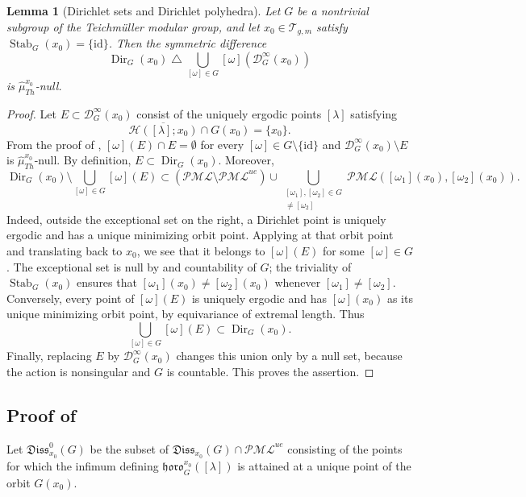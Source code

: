 \documentclass[dvipdfmx]{amsart}
\newtheorem{lemma}{Lemma}[section]
\theoremstyle{remark}
\newcommand{\teich}{\mathcal{T}}
\newcommand{\PThursM}{\hat{\mu}_{Th}}
\newcommand{\pml}{\mathcal{PML}}
\newcommand{\horo}{\mathfrak{horo}}
\newcommand{\Dirichlet}{\mathscr{D}}
\newcommand{\horos}{\mathscr{H}}
\newcommand{\dissipativepart}{\mathfrak{Diss}}
\begin{document}
\begin{lemma}[Dirichlet sets and Dirichlet polyhedra]
\label{lem:DirichletSets_Polyhedrons}
Let $G$ be a nontrivial subgroup of the Teichm\"uller modular group, and let
$x_0\in \teich_{g,m}$ satisfy $\operatorname{Stab}_G(x_0)=\{\mathrm{id}\}$.
Then the symmetric difference
\begin{equation}
\label{eq:symmetric_differenice_Dirichletset_Dirichlet_polyhedron}
\operatorname{Dir}_G(x_0)\bigtriangleup \bigcup_{[\omega]\in G}[\omega](\Dirichlet^\infty_G(x_0))
\end{equation}
is $\PThursM^{x_0}$-null.
\end{lemma}

\begin{proof}
Let $E\subset\Dirichlet^\infty_G(x_0)$ consist of the uniquely ergodic points $[\lambda]$ satisfying
\[
\overline{\horos([\lambda];x_0)}\cap G(x_0)=\{x_0\}.
\]
From the proof of , $[\omega](E)\cap E=\emptyset$ for every $[\omega]\in G\setminus\{\mathrm{id}\}$ and $\Dirichlet^\infty_G(x_0)\setminus E$ is $\PThursM^{x_0}$-null.
By definition, $E\subset \operatorname{Dir}_G(x_0)$. Moreover,
\[
\operatorname{Dir}_G(x_0)
\setminus\bigcup_{[\omega]\in G}[\omega](E)
\subset
(\pml\setminus\pml^{ue})
\cup
\bigcup_{\substack{[\omega_1],[\omega_2]\in G\\
[\omega_1]\ne[\omega_2]}}
\pml([\omega_1](x_0),[\omega_2](x_0)).
\]
Indeed, outside the exceptional set on the right, a Dirichlet
point is uniquely ergodic and has a unique minimizing orbit
point. Applying  at
that orbit point and translating back to $x_0$, we see that
it belongs to $[\omega](E)$ for some $[\omega]\in G$.
The exceptional set is null by  and countability
of $G$; the triviality of $\operatorname{Stab}_G(x_0)$ ensures that
$[\omega_1](x_0)\ne[\omega_2](x_0)$ whenever
$[\omega_1]\ne[\omega_2]$.
Conversely, every point of $[\omega](E)$ is uniquely ergodic and has
$[\omega](x_0)$ as its unique minimizing orbit point, by equivariance
of extremal length. Thus
\[
\bigcup_{[\omega]\in G}[\omega](E)\subset\operatorname{Dir}_G(x_0).
\]
Finally, replacing $E$ by $\Dirichlet^\infty_G(x_0)$ changes this
union only by a null set, because the action is nonsingular and $G$
is countable. This proves the assertion.
\end{proof}

\subsection{Proof of }
\label{subsec:Proof-Dissipative_part}
Let $\dissipativepart^0_{x_0}(G)$ be the subset of $\dissipativepart_{x_0}(G)\cap\pml^{ue}$ consisting of the points for which the infimum defining $\horo^{x_0}_G([\lambda])$ is attained at a unique point of the orbit $G(x_0)$.
\end{document}
